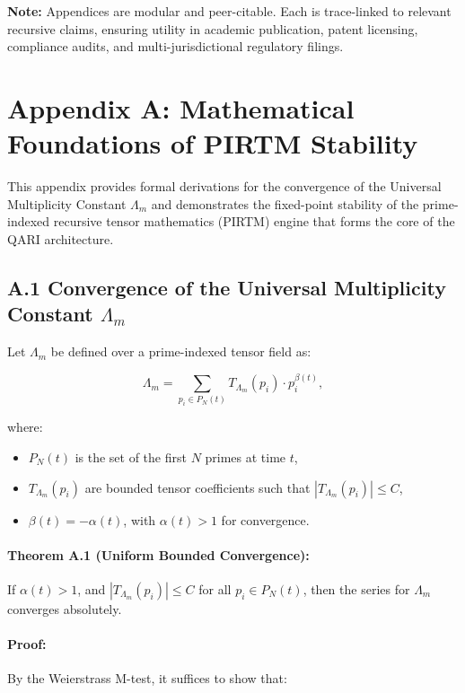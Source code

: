 \documentclass[12pt]{article}
\begin{document}
\begin{itemize}
\vspace{1em}
\noindent
\textbf{Note:} Appendices are modular and peer-citable. Each is trace-linked to relevant recursive claims, ensuring utility in academic publication, patent licensing, compliance audits, and multi-jurisdictional regulatory filings.

\appendix

\section*{Appendix A: Mathematical Foundations of PIRTM Stability}

This appendix provides formal derivations for the convergence of the Universal Multiplicity Constant \(\Lambda_m\) and demonstrates the fixed-point stability of the prime-indexed recursive tensor mathematics (PIRTM) engine that forms the core of the QARI architecture.

\subsection*{A.1 Convergence of the Universal Multiplicity Constant \(\Lambda_m\)}

Let \(\Lambda_m\) be defined over a prime-indexed tensor field as:

\[
\Lambda_m = \sum_{p_i \in P_N(t)} T_{\Lambda_m}(p_i) \cdot p_i^{\beta(t)},
\]

where:
\begin{itemize}
  \item \(P_N(t)\) is the set of the first \(N\) primes at time \(t\),
  \item \(T_{\Lambda_m}(p_i)\) are bounded tensor coefficients such that \(|T_{\Lambda_m}(p_i)| \leq C\),
  \item \(\beta(t) = -\alpha(t)\), with \(\alpha(t) > 1\) for convergence.
\end{itemize}

\paragraph{Theorem A.1 (Uniform Bounded Convergence):}
If \(\alpha(t) > 1\), and \(|T_{\Lambda_m}(p_i)| \leq C\) for all \(p_i \in P_N(t)\), then the series for \(\Lambda_m\) converges absolutely.

\paragraph{Proof:}
By the Weierstrass M-test, it suffices to show that:


\end{itemize}
\end{document}

